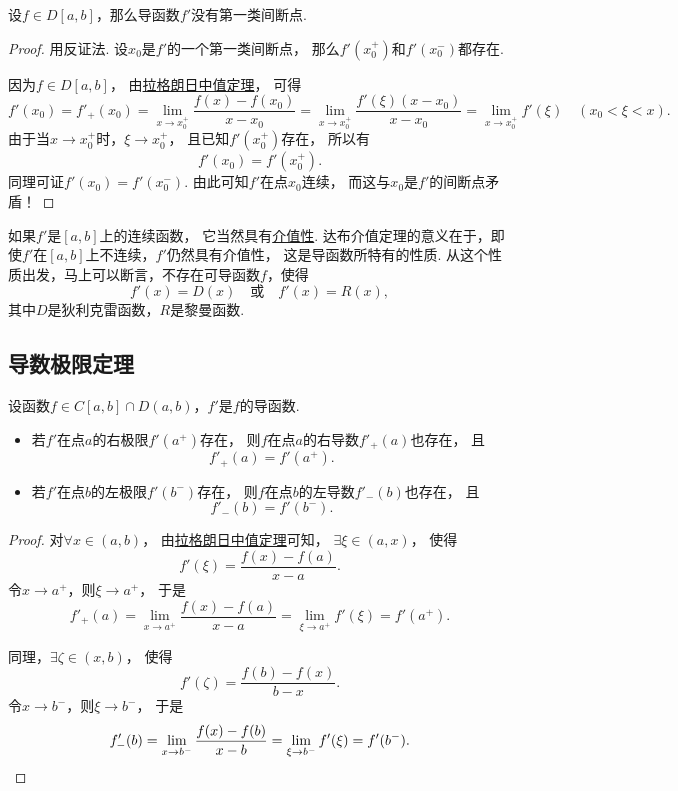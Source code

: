 \begin{theorem}
设\(f \in D[a,b]\)，那么导函数\(f'\)没有第一类间断点.
\begin{proof}
用反证法.
设\(x_0\)是\(f'\)的一个第一类间断点，
那么\(f'(x_0^+)\)和\(f'(x_0^-)\)都存在.

因为\(f \in D[a,b]\)，
由\hyperref[theorem:微分中值定理.拉格朗日中值定理]{拉格朗日中值定理}，
可得\[
	f'(x_0)
	= f'_+(x_0)
	= \lim_{x \to x_0^+} \frac{f(x)-f(x_0)}{x-x_0}
	= \lim_{x \to x_0^+} \frac{f'(\xi) (x-x_0)}{x-x_0}
	= \lim_{x \to x_0^+} f'(\xi)
	\quad(x_0<\xi<x).
\]
由于当\(x \to x_0^+\)时，\(\xi \to x_0^+\)，
且已知\(f'(x_0^+)\)存在，
所以有\[
	f'(x_0)=f'(x_0^+).
\]
同理可证\(f'(x_0)=f'(x_0^-)\).
由此可知\(f'\)在点\(x_0\)连续，
而这与\(x_0\)是\(f'\)的间断点矛盾！
\end{proof}
\end{theorem}
\begin{remark}
如果\(f'\)是\([a,b]\)上的连续函数，
它当然具有\hyperref[theorem:极限.闭区间上连续函数的性质.介值定理1]{介值性}.
达布介值定理的意义在于，即使\(f'\)在\([a,b]\)上不连续，\(f'\)仍然具有介值性，
这是导函数所特有的性质.
从这个性质出发，马上可以断言，不存在可导函数\(f\)，使得\[
	f'(x) = D(x)
	\quad\text{或}\quad
	f'(x) = R(x),
\]
其中\(D\)是狄利克雷函数，\(R\)是黎曼函数.
\end{remark}

\subsection{导数极限定理}
\begin{theorem}[导数极限定理]\label{theorem:微分中值定理.导数极限定理}
设函数\(f \in C[a,b] \cap D(a,b)\)，\(f'\)是\(f\)的导函数.
\begin{itemize}
	\item 若\(f'\)在点\(a\)的右极限\(f'(a^+)\)存在，
	则\(f\)在点\(a\)的右导数\(f'_+(a)\)也存在，
	且\[
		f'_+(a) = f'(a^+).
	\]
	\item 若\(f'\)在点\(b\)的左极限\(f'(b^-)\)存在，
	则\(f\)在点\(b\)的左导数\(f'_-(b)\)也存在，
	且\[
		f'_-(b) = f'(b^-).
	\]
\end{itemize}
\begin{proof}
对\(\forall x\in(a,b)\)，
由\hyperref[theorem:微分中值定理.拉格朗日中值定理]{拉格朗日中值定理}可知，
\(\exists\xi\in(a,x)\)，
使得\[
	f'(\xi) = \frac{f(x)-f(a)}{x-a}.
\]
令\(x \to a^+\)，则\(\xi \to a^+\)，
于是\[
	f'_+(a)
	= \lim_{x \to a^+} \frac{f(x)-f(a)}{x-a}
	= \lim_{\xi \to a^+} f'(\xi)
	= f'(a^+).
\]

同理，\(\exists\zeta\in(x,b)\)，
使得\[
	f'(\zeta) = \frac{f(b)-f(x)}{b-x}.
\]
令\(x \to b^-\)，则\(\xi \to b^-\)，
于是\[
	f'_-(b)
	= \lim_{x \to b^-} \frac{f(x)-f(b)}{x-b}
	= \lim_{\xi \to b^-} f'(\xi)
	= f'(b^-).
	\qedhere
\]
\end{proof}
\end{theorem}

